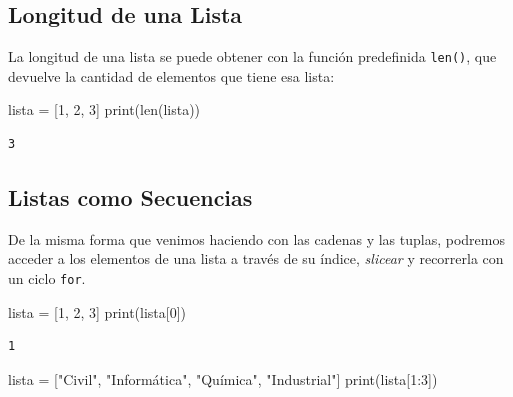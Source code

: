 \documentclass[
  letterpaper,
  DIV=11,
  numbers=noendperiod]{scrreprt}
\newenvironment{Shaded}{\begin{snugshade}}{\end{snugshade}}
\newcommand{\BuiltInTok}[1]{\textcolor[rgb]{0.00,0.23,0.31}{#1}}
\newcommand{\DecValTok}[1]{\textcolor[rgb]{0.68,0.00,0.00}{#1}}
\newcommand{\NormalTok}[1]{\textcolor[rgb]{0.00,0.23,0.31}{#1}}
\newcommand{\OperatorTok}[1]{\textcolor[rgb]{0.37,0.37,0.37}{#1}}
\newcommand{\StringTok}[1]{\textcolor[rgb]{0.13,0.47,0.30}{#1}}
\begin{document}
\subsection{Longitud de una Lista}\label{longitud-de-una-lista}

La longitud de una lista se puede obtener con la función predefinida
\texttt{len()}, que devuelve la cantidad de elementos que tiene esa
lista:

\begin{Shaded}
\begin{Highlighting}[]
\NormalTok{lista }\OperatorTok{=}\NormalTok{ [}\DecValTok{1}\NormalTok{, }\DecValTok{2}\NormalTok{, }\DecValTok{3}\NormalTok{]}
\BuiltInTok{print}\NormalTok{(}\BuiltInTok{len}\NormalTok{(lista))}
\end{Highlighting}
\end{Shaded}

\begin{verbatim}
3
\end{verbatim}

\subsection{Listas como Secuencias}\label{listas-como-secuencias}

De la misma forma que venimos haciendo con las cadenas y las tuplas,
podremos acceder a los elementos de una lista a través de su índice,
\emph{slicear} y recorrerla con un ciclo \texttt{for}.

\begin{Shaded}
\begin{Highlighting}[]
\NormalTok{lista }\OperatorTok{=}\NormalTok{ [}\DecValTok{1}\NormalTok{, }\DecValTok{2}\NormalTok{, }\DecValTok{3}\NormalTok{]}
\BuiltInTok{print}\NormalTok{(lista[}\DecValTok{0}\NormalTok{])}
\end{Highlighting}
\end{Shaded}

\begin{verbatim}
1
\end{verbatim}

\begin{Shaded}
\begin{Highlighting}[]
\NormalTok{lista }\OperatorTok{=}\NormalTok{ [}\StringTok{"Civil"}\NormalTok{, }\StringTok{"Informática"}\NormalTok{, }\StringTok{"Química"}\NormalTok{, }\StringTok{"Industrial"}\NormalTok{]}
\BuiltInTok{print}\NormalTok{(lista[}\DecValTok{1}\NormalTok{:}\DecValTok{3}\NormalTok{])}
\end{Highlighting}
\end{Shaded}
\end{document}

